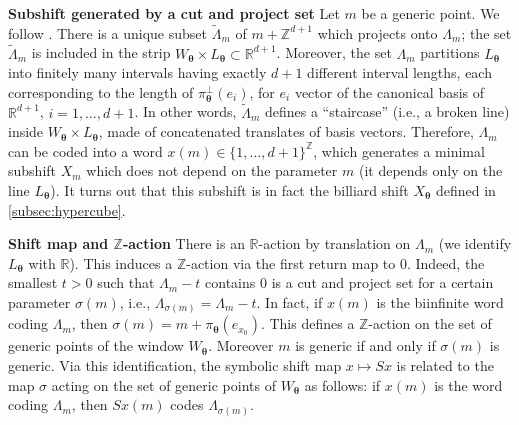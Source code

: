\documentclass{article}
\theoremstyle{definition}
\newcommand{\R}{\mathbb{R}}
\newcommand{\Z}{\mathbb{Z}}
\newcommand{\btheta}{\boldsymbol{\theta}}
\begin{document}
{\bf Subshift  generated by  a cut and project set}
 Let $m$ be a generic point. We follow   \cite{For.Hunt.Kellen.02}.
There is a unique subset $\widetilde{\Lambda}_m$ of $m + \mathbb Z^{d+1}$ which projects onto $\Lambda_m$; the set  $\widetilde{\Lambda}_m$ is included in the strip $W_{\btheta}  \times L_{\btheta} \subset \R^{d+1}$.  Moreover, the set $\Lambda_m$ partitions $L_{\btheta}$ into finitely many intervals having 
exactly $d+1$ different interval lengths, each corresponding to the length of  $\pi_{\btheta}^{\perp}(e_i)$, for  $e_i$ vector  of the canonical basis of $\mathbb R^{d+1}$, $i=1,\ldots, d+1$. %
In other words,  $\widetilde{\Lambda}_m$ defines a ``staircase'' (i.e., a broken line) inside $W_{\btheta} \times L_{\btheta}$, made of concatenated translates of basis vectors.
Therefore, $\Lambda_m$ can be coded into a   word $x(m)  \in \{1,\ldots, d+1\}^{\Z}$, which generates a minimal subshift $X_m$ which does not depend on the parameter $m$ (it depends only on the line $L_{\btheta}$). 
It turns out that this subshift  is in fact   the billiard shift $X_{\btheta}$ defined in \cref{subsec:hypercube}.

\medskip

{\bf  Shift map and $\mathbb Z$-action}
There is an $\mathbb R$-action by translation on $\Lambda_m$ (we identify $L_{\btheta}$ with ${\mathbb R}$).
 This induces a $\mathbb Z$-action via the first return map to $0$. Indeed, 
the   smallest  $t >0   $ such that $\Lambda_m - t$ contains $0$ is a cut
 and project set for a certain parameter $\sigma(m)$,  i.e., 
 $\Lambda_{\sigma(m)}=\Lambda_m-t$.
In fact, if $x(m)$ is the  biinfinite word coding $\Lambda_m$, then $\sigma(m) = m + \pi_{\btheta} (e_{x_0})$. %
This defines a $\mathbb Z$-action on the set   of generic points of the window $W_{\btheta}$. Moreover $m$ is generic if and only if $\sigma(m)$ is generic. Via this identification, the symbolic shift map $x \mapsto Sx$ is  related  to the  map $\sigma$ acting   on the set of generic points of  $W_{\btheta}$ as follows:
 if $x(m)$ is the word coding  $\Lambda_m$, then $Sx(m)$ codes  $\Lambda_{\sigma(m)}$.
\end{document}
